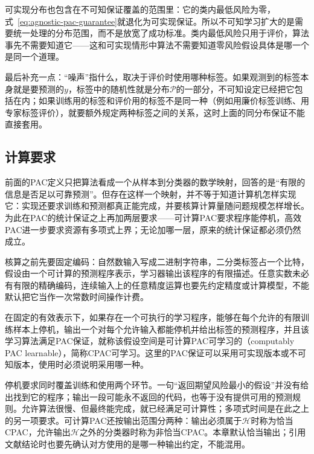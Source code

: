 可实现分布也包含在不可知保证覆盖的范围里：它的类内最低风险为零，式~\eqref{eq:agnostic-pac-guarantee}就退化为可实现保证。所以不可知学习扩大的是需要统一处理的分布范围，而不是放宽了成功标准。类内最低风险只用于评价，算法事先不需要知道它——这和可实现情形中算法不需要知道零风险假设具体是哪一个是同一个道理。

最后补充一点：“噪声”指什么，取决于评价时使用哪种标签。如果观测到的标签本身就是要预测的$y$，标签中的随机性就是分布$\mathcal P$的一部分，不可知设定已经把它包括在内；如果训练用的标签和评价用的标签不是同一种（例如用廉价标签训练、用专家标签评价），就要额外规定两种标签之间的关系，这时上面的同分布保证不能直接套用。

\subsection{计算要求}
\label{sec:pac-computation-requirements}

前面的PAC定义只把算法看成一个从样本到分类器的数学映射，回答的是“有限的信息是否足以可靠预测”。但存在这样一个映射，并不等于知道计算机怎样实现它：实现还要求训练和预测都真正能完成，并要核算计算量随问题规模怎样增长。为此在PAC的统计保证之上再加两层要求——可计算PAC要求程序能停机，高效PAC进一步要求资源有多项式上界；无论加哪一层，原来的统计保证都必须仍然成立。

核算之前先要固定编码：自然数输入写成二进制字符串，二分类标签占一个比特，假设由一个可计算的预测程序表示，学习器输出该程序的有限描述。任意实数未必有有限的精确编码，连续输入上的任意精度运算也要先约定精度或计算模型，不能默认把它当作一次常数时间操作计费。

\begin{definition}[可计算PAC学习]
\label{def:computable-pac-learning}
在固定的有效表示下，如果存在一个可执行的学习程序，能够在每个允许的有限训练样本上停机，输出一个对每个允许输入都能停机并给出标签的预测程序，并且该学习算法满足PAC保证，就称该假设空间是可计算PAC可学习的（computably PAC learnable），简称CPAC可学习。这里的PAC保证可以采用可实现版本或不可知版本，使用时必须说明采用哪一种。
\end{definition}

停机要求同时覆盖训练和使用两个环节。一句“返回期望风险最小的假设”并没有给出找到它的程序；输出一段可能永不返回的代码，也等于没有提供可用的预测规则。允许算法很慢、但最终能完成，就已经满足可计算性；多项式时间是在此之上的另一项要求。可计算PAC还按输出范围分两种：输出必须属于$\mathcal H$时称为恰当CPAC，允许输出$\mathcal H$之外的分类器时称为非恰当CPAC。本章默认恰当输出；引用文献结论时也要先确认对方使用的是哪一种输出约定，不能混用。


